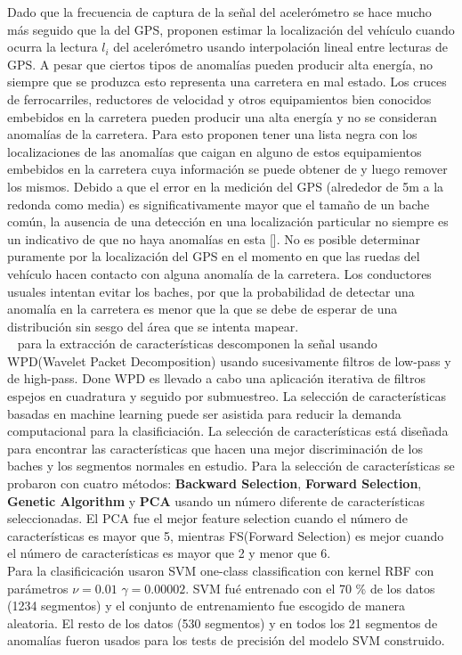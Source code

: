 Dado que la frecuencia de captura de la señal del acelerómetro se hace mucho más seguido que la del GPS, proponen estimar la localización del vehículo
cuando ocurra la lectura $l_i$ del acelerómetro usando interpolación lineal entre lecturas de GPS. A pesar que ciertos tipos de anomalías pueden producir
alta energía, no siempre que se produzca esto representa una carretera en mal estado. Los cruces de ferrocarriles, reductores de velocidad y otros
equipamientos bien conocidos embebidos en la carretera pueden producir una alta energía y no se consideran anomalías de la carretera. Para esto proponen
tener una lista negra con los localizaciones de las anomalías que caigan en alguno de estos equipamientos embebidos en la carretera cuya información se
puede obtener de y luego remover los mismos. Debido a que el error en la medición del GPS (alrededor de 5m a la redonda como media) es significativamente
mayor que el tamaño de un bache común, la ausencia de una detección en una localización particular no siempre es un indicativo de que no haya anomalías en
esta []. No es posible determinar puramente por la localización del GPS en el momento en que las ruedas del vehículo hacen contacto con alguna anomalía de
la carretera. Los conductores usuales intentan evitar los baches, por que la probabilidad de detectar una anomalía en la carretera es menor que la que se
debe de esperar de una distribución sin sesgo del área que se intenta mapear.\\

~\cite{cong2013applying} para la extracción de características descomponen la señal usando WPD(Wavelet Packet Decomposition) usando sucesivamente filtros de low-pass y de high-pass.
Done WPD es llevado a cabo una aplicación iterativa de filtros espejos en cuadratura y seguido por submuestreo. La selección de características basadas 
en machine learning puede ser asistida para reducir la demanda computacional para la clasificiación. La selección de características está diseñada para
encontrar las características que hacen una mejor discriminación de los baches y los segmentos normales en estudio. 
Para la selección de características se probaron con cuatro métodos: \textbf{Backward Selection}, \textbf{Forward Selection}, \textbf{Genetic Algorithm} y
\textbf{PCA} usando un número diferente de características seleccionadas. El PCA fue el mejor feature selection cuando el número de características es mayor 
que 5, mientras FS(Forward Selection) es mejor cuando el número de características es mayor que 2 y menor que 6.
\\
Para la clasificicación usaron SVM one-class classification con kernel RBF con parámetros  $\nu = 0.01$  $\gamma = 0.00002$. SVM fué entrenado con el 70 \%  de los datos 
(1234 segmentos) y el conjunto de entrenamiento fue escogido de manera aleatoria. El resto de los datos  (530 segmentos) y en todos los 21 segmentos de anomalías fueron 
usados para los tests de precisión del modelo SVM construido. 

